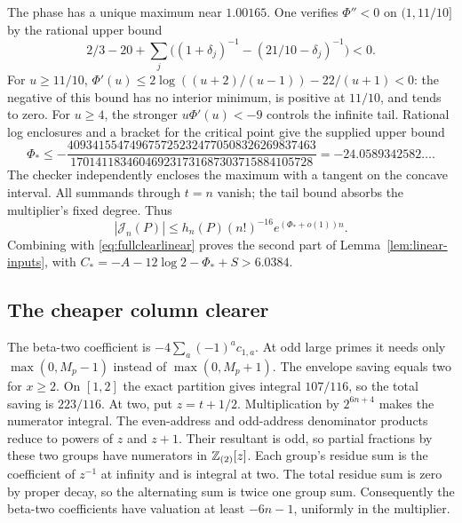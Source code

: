 The phase has a unique maximum near $1.00165$. One verifies
$\Phi''<0$ on $(1,11/10]$ by the rational upper bound
\[
 2/3-20+\sum_j\bigl((1+\delta_j)^{-1}-(21/10-\delta_j)^{-1}\bigr)<0.
\]
For $u\geq11/10$, $\Phi'(u)\leq
2\log((u+2)/(u-1))-22/(u+1)<0$: the negative of this bound has
no interior minimum, is positive at $11/10$, and tends to zero.
For $u\geq4$, the stronger $u\Phi'(u)<-9$ controls the infinite
tail. Rational log enclosures and a bracket for the critical point
give the supplied upper bound
\[
 \Phi_*\leq
 -\frac{4093415547496757252324770508326269837463}
        {170141183460469231731687303715884105728}
 =-24.0589342582\ldots.
\]
The checker independently encloses the maximum with a tangent on the
concave interval. All summands through $t=n$ vanish; the tail bound
absorbs the multiplier's fixed degree. Thus
\[
 |\mathcal J_n(P)|\leq h_n(P)(n!)^{-16}
                       e^{(\Phi_*+o(1))n}.
\]
Combining with \eqref{eq:fullclearlinear} proves the second part of
Lemma~\ref{lem:linear-inputs}, with
$C_*=-A-12\log2-\Phi_*+S>6.0384$.

\subsection{The cheaper column clearer}
The beta-two coefficient is $-4\sum_a(-1)^ac_{1,a}$. At odd large
primes it needs only $\max(0,M_p-1)$ instead of $\max(0,M_p+1)$.
The envelope saving equals two for $x\geq2$. On $[1,2]$ the exact
partition gives integral $107/116$, so the total saving is $223/116$.
At two, put $z=t+1/2$. Multiplication by $2^{6n+4}$ makes the
numerator integral. The even-address and odd-address denominator
products reduce to powers of $z$ and $z+1$. Their resultant is odd,
so partial fractions by these two groups have numerators in
$\mathbb Z_{(2)}[z]$. Each group's residue sum is the coefficient of $z^{-1}$
at infinity and is integral at two. The total residue sum is zero
by proper decay, so the alternating sum is twice one group sum.
Consequently the beta-two coefficients have valuation at least
$-6n-1$, uniformly in the multiplier.

